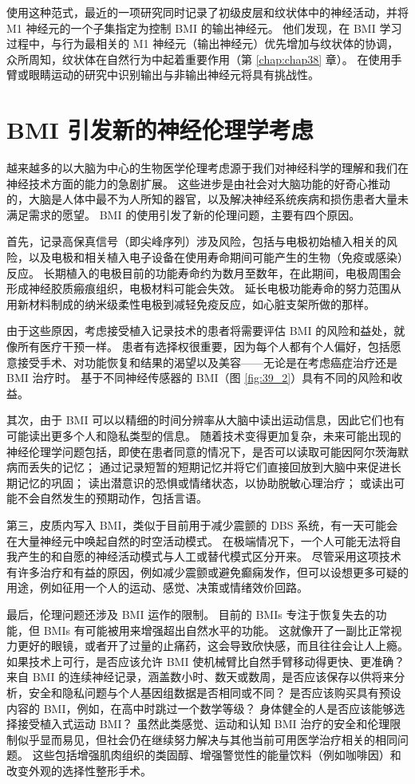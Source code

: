 使用这种范式，最近的一项研究同时记录了初级皮层和纹状体中的神经活动，并将 M1 神经元的一个子集指定为控制 BMI 的输出神经元。 
他们发现，在 BMI 学习过程中，与行为最相关的 M1 神经元（输出神经元）优先增加与纹状体的协调，众所周知，纹状体在自然行为中起着重要作用（第 \ref{chap:chap38} 章）。 
在使用手臂或眼睛运动的研究中识别输出与非输出神经元将具有挑战性。


\section{BMI 引发新的神经伦理学考虑}

越来越多的以大脑为中心的生物医学伦理考虑源于我们对神经科学的理解和我们在神经技术方面的能力的急剧扩展。 
这些进步是由社会对大脑功能的好奇心推动的，大脑是人体中最不为人所知的器官，以及解决神经系统疾病和损伤患者大量未满足需求的愿望。 
BMI 的使用引发了新的伦理问题，主要有四个原因。


首先，记录高保真信号（即尖峰序列）涉及风险，包括与电极初始植入相关的风险，以及电极和相关植入电子设备在使用寿命期间可能产生的生物（免疫或感染）反应。 
长期植入的电极目前的功能寿命约为数月至数年，在此期间，电极周围会形成神经胶质瘢痕组织，电极材料可能会失效。 
延长电极功能寿命的努力范围从用新材料制成的纳米级柔性电极到减轻免疫反应，如心脏支架所做的那样。


由于这些原因，考虑接受植入记录技术的患者将需要评估 BMI 的风险和益处，就像所有医疗干预一样。 
患者有选择权很重要，因为每个人都有个人偏好，包括愿意接受手术、对功能恢复和结果的渴望以及美容——无论是在考虑癌症治疗还是 BMI 治疗时。 
基于不同神经传感器的 BMI（图 \ref{fig:39_2}）具有不同的风险和收益。


其次，由于 BMI 可以以精细的时间分辨率从大脑中读出运动信息，因此它们也有可能读出更多个人和隐私类型的信息。 
随着技术变得更加复杂，未来可能出现的神经伦理学问题包括，即使在患者同意的情况下，是否可以读取可能因阿尔茨海默病而丢失的记忆； 
通过记录短暂的短期记忆并将它们直接回放到大脑中来促进长期记忆的巩固； 
读出潜意识的恐惧或情绪状态，以协助脱敏心理治疗； 
或读出可能不会自然发生的预期动作，包括言语。


第三，皮质内写入 BMI，类似于目前用于减少震颤的 DBS 系统，有一天可能会在大量神经元中唤起自然的时空活动模式。 
在极端情况下，一个人可能无法将自我产生的和自愿的神经活动模式与人工或替代模式区分开来。 
尽管采用这项技术有许多治疗和有益的原因，例如减少震颤或避免癫痫发作，但可以设想更多可疑的用途，例如征用一个人的运动、感觉、决策或情绪效价回路。


最后，伦理问题还涉及 BMI 运作的限制。 
目前的 BMIs 专注于恢复失去的功能，但 BMIs 有可能被用来增强超出自然水平的功能。 
这就像开了一副比正常视力更好的眼镜，或者开了过量的止痛药，这会导致欣快感，而且往往会让人上瘾。 
如果技术上可行，是否应该允许 BMI 使机械臂比自然手臂移动得更快、更准确？ 
来自 BMI 的连续神经记录，涵盖数小时、数天或数周，是否应该保存以供将来分析，安全和隐私问题与个人基因组数据是否相同或不同？ 
是否应该购买具有预设内容的 BMI，例如，在高中时跳过一个数学等级？ 
身体健全的人是否应该能够选择接受植入式运动 BMI？ 
虽然此类感觉、运动和认知 BMI 治疗的安全和伦理限制似乎显而易见，但社会仍在继续努力解决与其他当前可用医学治疗相关的相同问题。 
这些包括增强肌肉组织的类固醇、增强警觉性的能量饮料（例如咖啡因）和改变外观的选择性整形手术。


